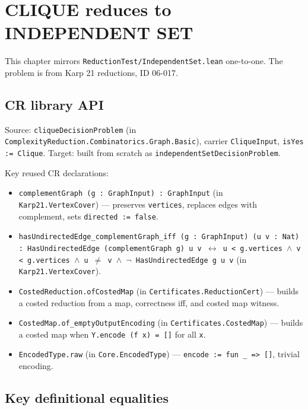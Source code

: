 
\section{CLIQUE reduces to INDEPENDENT SET}
\label{sec:independent_set}

This chapter mirrors \texttt{ReductionTest/IndependentSet.lean} one-to-one.
The problem is from Karp 21 reductions, ID 06-017.

\subsection*{CR library API}

Source: \texttt{cliqueDecisionProblem} (in
\texttt{ComplexityReduction.Combinatorics.Graph.Basic}), carrier
\texttt{CliqueInput}, \texttt{isYes := Clique}. Target: built from scratch
as \texttt{independentSetDecisionProblem}.

Key reused CR declarations:
\begin{itemize}
  \item \texttt{complementGraph (g : GraphInput) : GraphInput}
    (in \texttt{Karp21.VertexCover}) --- preserves \texttt{vertices},
    replaces edges with complement, sets \texttt{directed := false}.
  \item \texttt{hasUndirectedEdge\_complementGraph\_iff (g : GraphInput)
    (u v : Nat) : HasUndirectedEdge (complementGraph g) u v $\leftrightarrow$
    u < g.vertices $\wedge$ v < g.vertices $\wedge$ u $\neq$ v $\wedge$
    $\neg$ HasUndirectedEdge g u v}
    (in \texttt{Karp21.VertexCover}).
  \item \texttt{CostedReduction.ofCostedMap} (in
    \texttt{Certificates.ReductionCert}) --- builds a costed reduction
    from a map, correctness iff, and costed map witness.
  \item \texttt{CostedMap.of\_emptyOutputEncoding} (in
    \texttt{Certificates.CostedMap}) --- builds a costed map when
    \texttt{Y.encode (f x) = []} for all \texttt{x}.
  \item \texttt{EncodedType.raw} (in \texttt{Core.EncodedType}) ---
    \texttt{encode := fun \_ => []}, trivial encoding.
\end{itemize}

\subsection*{Key definitional equalities}

